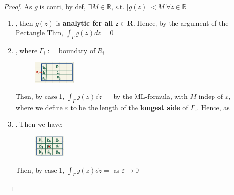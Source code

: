 \documentclass[12pt,a4paper]{article}
\begin{document}
\begin{proof}
  As $g$ is conti, by def, $\exists M \in \mathbb{R}$, s.t. $|g(z)| < M\ \forall z \in \mathbb{R}$

  \begin{enumerate}
    \item {}, then $g(z)$ is \textbf{analytic for all $\mathbf{z \in R}$}. Hence, by the argument of the Rectangle Thm, $\int_\Gamma g(z) dz = 0$
    \item {}, where $\Gamma_i :=$ boundary of $R_i$
    \begin{figure}[h]
      \centering
      \includegraphics[width=0.20\textwidth]{img/case2_rect2.png}
    \end{figure}

    Then, by case 1, $\int_\Gamma g(z) dz =$  by the ML-formula, with $M$ indep of $\varepsilon$, where we define $\varepsilon$ to be the length of the \textbf{longest side} of $\Gamma_s$. Hence, as 
    \item {}. Then we have:

    \vspace{0.4em}\begin{figure}[h]
      \centering
      \includegraphics[width=0.15\textwidth]{img/case3_rect2.png}
    \end{figure}

    Then, by case 1, $\int_\Gamma g(z) dz=$  as $\varepsilon \to 0$
  \end{enumerate}
\end{proof}


\end{document}

